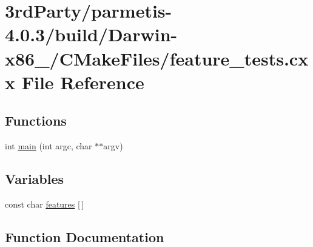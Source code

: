 \hypertarget{3rd_party_2parmetis-4_80_83_2build_2_darwin-x86__64_2_c_make_files_2feature__tests_8cxx}{}\section{3rd\+Party/parmetis-\/4.0.3/build/\+Darwin-\/x86\+\_/\+C\+Make\+Files/feature\+\_\+tests.cxx File Reference}
\label{3rd_party_2parmetis-4_80_83_2build_2_darwin-x86__64_2_c_make_files_2feature__tests_8cxx}
\subsection*{Functions}
\begin{DoxyCompactItemize}
\item 
int \hyperlink{3rd_party_2parmetis-4_80_83_2build_2_darwin-x86__64_2_c_make_files_2feature__tests_8cxx_a3c04138a5bfe5d72780bb7e82a18e627}{main} (int argc, char $\ast$$\ast$argv)
\end{DoxyCompactItemize}
\subsection*{Variables}
\begin{DoxyCompactItemize}
\item 
const char \hyperlink{3rd_party_2parmetis-4_80_83_2build_2_darwin-x86__64_2_c_make_files_2feature__tests_8cxx_a1582568e32f689337602a16bf8a5bff0}{features} \mbox{[}$\,$\mbox{]}
\end{DoxyCompactItemize}


\subsection{Function Documentation}
\mbox{\label{3rd_party_2parmetis-4_80_83_2build_2_darwin-x86__64_2_c_make_files_2feature__tests_8cxx_a3c04138a5bfe5d72780bb7e82a18e627}} 
